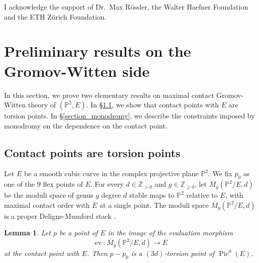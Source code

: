 \documentclass[11pt,letterpaper]{amsart}
\newtheorem{lem}[defn]{Lemma}
\newcommand\PP{\mathbb P}
\newcommand\Z{\mathbb Z}
\newcommand\Pic{\operatorname{Pic}}
\newcommand\ev{\operatorname{ev}}
\begin{document}
I acknowledge the support of Dr.\ Max R\"ossler, the Walter Haefner Foundation and the ETH Z\"urich
Foundation.



\section{Preliminary results on the Gromov-Witten side}
\label{section_preliminary}

In this section, we prove two elementary results on maximal contact
Gromov-Witten theory of $(\PP^2,E)$. In \S \ref{section_contact_torsion}, we show that contact points with $E$ are torsion points. In \S \ref{section_monodromy}, we describe the constraints imposed by monodromy on the dependence on the contact point.

\subsection{Contact points are torsion points}
\label{section_contact_torsion}
Let $E$ be a smooth cubic curve in the complex projective plane $\PP^2$.
We fix $p_0$ as one of the $9$ flex points of $E$.
For every $d \in \Z_{>0}$ and $g \in \Z_{\geqslant 0}$, let
$\overline{M}_{g}(\PP^2/E,d)$ be the moduli space of 
genus $g$ degree $d$ stable maps to $\PP^2$ relative to $E$,
with maximal contact order with $E$ at a single point.
The moduli space $\overline{M}_{g}(\PP^2/E,d)$ is a proper Deligne-Mumford stack
\cite{MR1882667, MR1938113}.

\begin{lem}\label{lem_contact_torsion}
Let $p$ be a point of $E$ in the image of the evaluation morphism 
\[\ev \colon \overline{M}_{g}(\PP^2/E,d) 
\rightarrow E\,\]
at the contact point with $E$.
Then $p-p_0$ is a 
$(3d)$-torsion point of $\Pic^0(E)$.
\end{lem}
\end{document}

